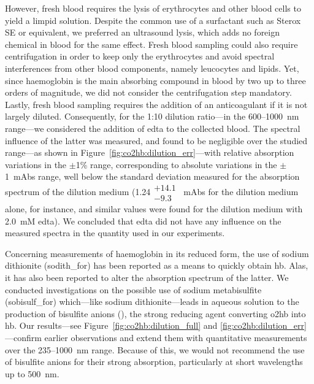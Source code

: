 However, fresh blood requires the lysis of erythrocytes and other blood cells to yield a limpid solution. Despite the common use of a surfactant such as Sterox SE\cite{assendelft1970, mook1979, zijlstra1991} or equivalent\cite{horecker1943, wray1988, cope1991}, we preferred an ultrasound lysis, which adds no foreign chemical in blood for the same effect\cite{mendelson1989}. Fresh blood sampling could also require centrifugation in order to keep only the erythrocytes and avoid spectral interferences from other blood components, namely leucocytes and lipids. Yet, since haemoglobin is the main absorbing compound in blood by two up to three orders of magnitude\cite{meinke2007}, we did not consider the centrifugation step mandatory. Lastly, fresh blood sampling requires the addition of an anticoagulant if it is not largely diluted. Consequently, for the 1:10 dilution ratio---in the 600--1000~nm range---we considered the addition of \gls{edta} to the collected blood. The spectral influence of the latter was measured, and found to be negligible over the studied range---as shown in Figure~\ref{fig:co2hb:dilution_err}---with relative absorption variations in the $\pm$1\% range, corresponding to absolute variations in the $\pm$1~mAbs range, well below the standard deviation measured for the absorption spectrum of the dilution medium (1.24$\substack{+14.1 \\ -9.3}$~mAbs for the dilution medium alone, for instance, and similar values were found for the dilution medium with 2.0~mM \gls{edta}). We concluded that \gls{edta} did not have any influence on the measured spectra in the quantity used in our experiments.

Concerning measurements of haemoglobin in its reduced form, the use of sodium dithionite (\gls{sodith_for}) has been reported as a means to quickly obtain \gls{hb}\cite{barlow1962, assendelft1970, mendelson1989, robles2010, mieczkowska2011}. Alas, it has also been reported to alter the absorption spectrum of the latter\cite{dalziel1957, schubart1957, zijlstra2000}. We conducted investigations on the possible use of sodium metabisulfite (\gls{sobisulf_for}) which---like sodium dithionite---leads in aqueous solution to the production of bisulfite anions (), the strong reducing agent converting \gls{o2hb} into \gls{hb}. Our results---see Figure~\ref{fig:co2hb:dilution_full} and \ref{fig:co2hb:dilution_err}---confirm earlier observations and extend them with quantitative measurements over the 235--1000~nm range. Because of this, we would not recommend the use of bisulfite anions for their strong absorption, particularly at short wavelengths up to 500~nm.

